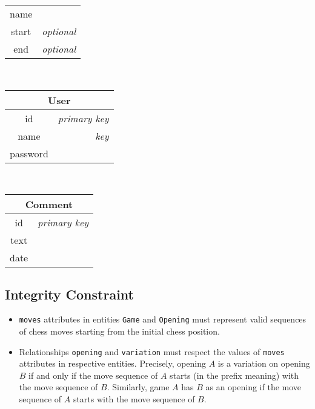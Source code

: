 \documentclass{article}
\begin{document}
\begin{table}[ht!]
\begin{subtable}{3.5cm}
\begin{tabular}[t]{|cr|}
	\hline
	name   &                  \\
	start  & \em{optional}    \\
	end    & \em{optional}    \\
	\hline
	\end{tabular}
    \end{subtable}
    ~
    \begin{subtable}{3.5cm}
	\begin{tabular}[t]{|cr|}
	\hline
	\multicolumn{2}{|c|}{\textbf{User}} \\
	\hline
	id       & \em{primary key} \\
	name     & \em{key}         \\
	password &                  \\
	\hline
	\end{tabular}
    \end{subtable}
    ~
    \begin{subtable}{3.5cm}
	\begin{tabular}[t]{|cr|}
	\hline
	\multicolumn{2}{|c|}{\textbf{Comment}} \\
	\hline
	id     & \em{primary key} \\
	text   &                  \\
	date   &                  \\
	\hline
	\end{tabular}
    \end{subtable}
\end{table}


\subsection{Integrity Constraint}
\begin{itemize}
\item \verb|moves| attributes in entities \verb|Game| and \verb|Opening| must represent
valid sequences of chess moves starting from the initial chess position.

\item Relationships \verb|opening| and \verb|variation| must respect the values of \verb|moves|
attributes in respective entities.
Precisely, opening $A$ is a variation on opening $B$ if and only if the move sequence
of $A$ starts (in the prefix meaning) with the move sequence of $B$.
Similarly, game $A$ has $B$ as an opening if the move sequence of $A$ starts
with the move sequence of $B$.
\end{itemize}
\end{document}
